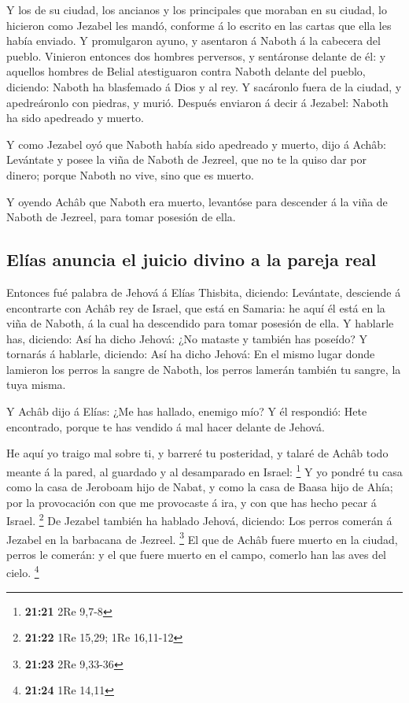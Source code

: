  Y los de su ciudad, los ancianos y los principales que
moraban en su ciudad, lo hicieron como Jezabel les mandó, conforme á lo
escrito en las cartas que ella les había enviado.  Y
promulgaron ayuno, y asentaron á Naboth á la cabecera del pueblo.
 Vinieron entonces dos hombres perversos, y sentáronse
delante de él: y aquellos hombres de Belial atestiguaron contra Naboth
delante del pueblo, diciendo: Naboth ha blasfemado á Dios y al rey. Y
sacáronlo fuera de la ciudad, y apedreáronlo con piedras, y murió.
 Después enviaron á decir á Jezabel: Naboth ha sido
apedreado y muerto.

 Y como Jezabel oyó que Naboth había sido apedreado y
muerto, dijo á Achâb: Levántate y posee la viña de Naboth de Jezreel,
que no te la quiso dar por dinero; porque Naboth no vive, sino que es
muerto.

 Y oyendo Achâb que Naboth era muerto, levantóse para
descender á la viña de Naboth de Jezreel, para tomar posesión de ella.

\hypertarget{eluxedas-anuncia-el-juicio-divino-a-la-pareja-real}{%
\subsection{Elías anuncia el juicio divino a la pareja
real}\label{eluxedas-anuncia-el-juicio-divino-a-la-pareja-real}}

 Entonces fué palabra de Jehová á Elías Thisbita,
diciendo:  Levántate, desciende á encontrarte con Achâb
rey de Israel, que está en Samaria: he aquí él está en la viña de
Naboth, á la cual ha descendido para tomar posesión de ella.
 Y hablarle has, diciendo: Así ha dicho Jehová: ¿No
mataste y también has poseído? Y tornarás á hablarle, diciendo: Así ha
dicho Jehová: En el mismo lugar donde lamieron los perros la sangre de
Naboth, los perros lamerán también tu sangre, la tuya misma.

 Y Achâb dijo á Elías: ¿Me has hallado, enemigo mío? Y él
respondió: Hete encontrado, porque te has vendido á mal hacer delante de
Jehová.

 He aquí yo traigo mal sobre ti, y barreré tu posteridad,
y talaré de Achâb todo meante á la pared, al guardado y al desamparado
en Israel: \footnote{\textbf{21:21} 2Re 9,7-8}  Y yo
pondré tu casa como la casa de Jeroboam hijo de Nabat, y como la casa de
Baasa hijo de Ahía; por la provocación con que me provocaste á ira, y
con que has hecho pecar á Israel. \footnote{\textbf{21:22} 1Re 15,29;
  1Re 16,11-12}  De Jezabel también ha hablado Jehová,
diciendo: Los perros comerán á Jezabel en la barbacana de Jezreel.
\footnote{\textbf{21:23} 2Re 9,33-36}  El que de Achâb
fuere muerto en la ciudad, perros le comerán: y el que fuere muerto en
el campo, comerlo han las aves del cielo. \footnote{\textbf{21:24} 1Re
  14,11}

